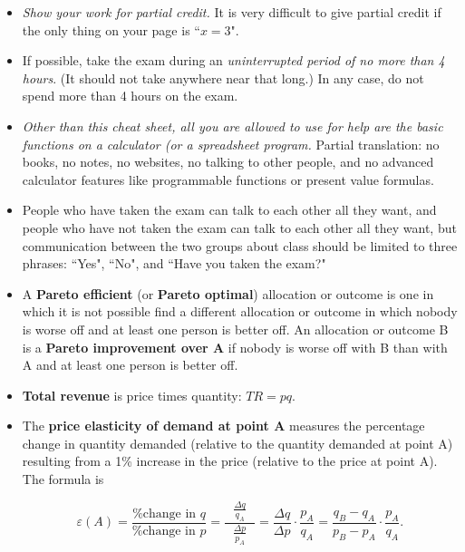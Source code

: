 \documentclass{article}
\begin{document}
\begin{EXAM}

\begin{itemize}

\item \emph{Show your work for partial credit.} It is very difficult to give partial credit if the only thing on your
page is ``$x=3$".


\item If possible, take the exam during an \emph{uninterrupted period of no more than 4 hours}. (It should not take anywhere near that long.) In any case, do not spend more than 4 hours on the exam.

\item \emph{Other than this cheat sheet, all you are allowed to use for help are the basic functions on a calculator (or a spreadsheet program.}
Partial translation: no books, no notes, no websites, no talking to other people, and no advanced calculator features
like programmable functions or present value formulas.

\item People who have taken the exam can talk to each other all they want, and people who have not taken the exam can
talk to each other all they want, but communication between the two groups about class should be limited to three
phrases: ``Yes", ``No", and ``Have you taken the exam?"

\item A \textbf{Pareto efficient} (or \textbf{Pareto optimal}) allocation or outcome is one in which it is not possible find a different allocation or outcome in which nobody is worse off and at least one person is better off. An allocation or outcome B is a \textbf{Pareto improvement over A} if nobody is worse off with B than with A and at least one person is better off.

\item \textbf{Total revenue} is price times quantity: $TR = pq$.

\item The \textbf{price elasticity of demand at point A} measures the percentage change in quantity demanded (relative to the quantity demanded at point A) resulting from a 1\% increase in the price (relative to the price at point A). The formula is

\[
\varepsilon (A)=\frac{\mbox{\% change in } q}{\mbox{\% change in } p} = \displaystyle\frac{\ \ \ \displaystyle\frac{\Delta q}{q_A}\ \ \ }{\displaystyle\frac{\Delta p}{p_A}} =
\frac{\Delta q}{\Delta p}\cdot\frac{p_A}{q_A} =
\frac{q_B-q_A}{p_B-p_A}\cdot\frac{p_A}{q_A}.
\]



\end{itemize}
\end{EXAM}
\end{document}

